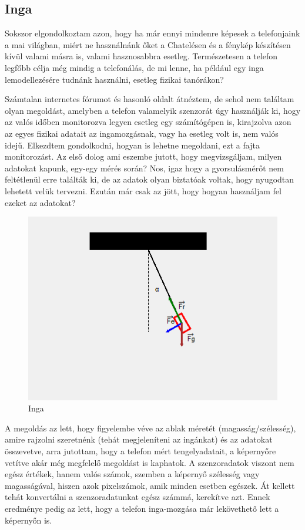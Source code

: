 \documentclass{thesis-ekf}
\theoremstyle{definition}
\theoremstyle{remark}
\begin{document}
\subsection{Inga}
Sokszor elgondolkoztam azon, hogy ha már ennyi mindenre képesek a telefonjaink a mai világban, miért ne használnánk őket a Chatelésen és a fénykép készítésen kívül valami másra is, valami hasznosabbra esetleg. Természetesen a telefon legfőbb célja még mindig a telefonálás, de mi lenne, ha például egy inga lemodellezésére tudnánk használni, esetleg fizikai tanórákon?
\par Számtalan internetes fórumot és hasonló oldalt átnéztem, de sehol nem találtam olyan megoldást, amelyben a telefon valamelyik szenzorát úgy használják ki, hogy az valós időben monitorozva legyen esetleg egy számítógépen is, kirajzolva azon az egyes fizikai adatait az ingamozgásnak, vagy ha esetleg volt is, nem valós idejű. Elkezdtem gondolkodni, hogyan is lehetne megoldani, ezt a fajta monitorozást. Az első dolog ami eszembe jutott, hogy megvizsgáljam, milyen adatokat kapunk, egy-egy mérés során? Nos, igaz hogy a gyorsulásmérőt nem feltétlenül erre találták ki, de az adatok olyan biztatóak voltak, hogy nyugodtan lehetett velük tervezni. Ezután már csak az jött, hogy hogyan használjam fel ezeket az adatokat?
\begin{figure}[!h]
	\centering
	\includegraphics[width=15cm]{ingamodell}
	\caption{Inga}\label{inga}
\end{figure}
\par A megoldás az lett, hogy figyelembe véve az ablak méretét (magasság/szélesség), amire rajzolni szeretnénk (tehát megjeleníteni az ingánkat) és az adatokat összevetve, arra jutottam, hogy a telefon mért tengelyadatait, a képernyőre vetítve akár még megfelelő megoldást is kaphatok. A szenzoradatok viszont nem egész értékek, hanem valós számok, szemben a képernyő szélesség vagy magasságával, hiszen azok pixelszámok, amik minden esetben egészek. Át kellett tehát konvertálni a szenzoradatunkat egész számmá, kerekítve azt. Ennek eredménye pedig az lett, hogy a telefon inga-mozgása már lekövethető lett a képernyőn is. 
\end{document}
